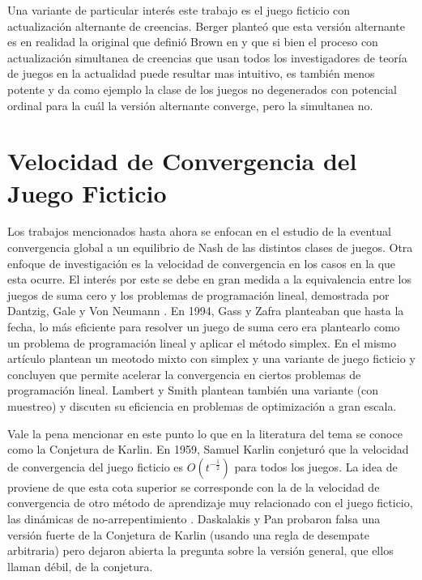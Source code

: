 Una variante de particular interés este trabajo es el juego ficticio con actualización alternante de creencias. Berger \cite{browns:original} planteó que esta versión alternante es en realidad la original que definió Brown en \cite{browns:original} y que si bien el proceso con actualización simultanea de creencias que usan todos los investigadores de teoría de juegos en la actualidad puede resultar mas intuitivo, es también menos potente y da como ejemplo la clase de los juegos no degenerados con potencial ordinal para la cuál la versión alternante converge, pero la simultanea no.

\section{Velocidad de Convergencia del Juego Ficticio}

Los trabajos mencionados hasta ahora se enfocan en el estudio de la eventual convergencia global a un equilibrio de Nash de las distintos clases de juegos. Otra enfoque de investigación es la velocidad de convergencia en los casos en la que esta ocurre. El interés por este se debe en gran medida a la equivalencia entre los juegos de suma cero y los problemas de programación lineal, demostrada por Dantzig, Gale y Von Neumann \cite{fplp:equiv} \cite{programming:game:equivalence}. En 1994, Gass y Zafra \cite{modified:fp:linear} planteaban que hasta la fecha, lo más eficiente para resolver un juego de suma cero era plantearlo como un problema de programación lineal y aplicar el método simplex. En el mismo artículo plantean un meotodo mixto con simplex y una variante de juego ficticio y concluyen que permite acelerar la convergencia en ciertos problemas de programación lineal. Lambert y Smith \cite{aproach:large:scale} plantean también una variante (con muestreo) y discuten su eficiencia en problemas de optimización a gran escala.

Vale la pena mencionar en este punto lo que en la literatura del tema se conoce como la Conjetura de Karlin. En 1959, Samuel Karlin \cite{karlin:conjecture} conjeturó que la velocidad de convergencia del juego ficticio es $O(t^{-\frac{1}{2}})$ para todos los juegos. La idea de proviene de que esta cota superior se corresponde con la de la velocidad de convergencia de otro método de aprendizaje muy relacionado con el juego ficticio, las dinámicas de no-arrepentimiento \cite{no:regret} \cite{no:regret:2}. Daskalakis y Pan \cite{counter:karlin:strong} probaron falsa una versión fuerte de la Conjetura de Karlin (usando una regla de desempate arbitraria) pero dejaron abierta la pregunta sobre la versión general, que ellos llaman débil, de la conjetura.

